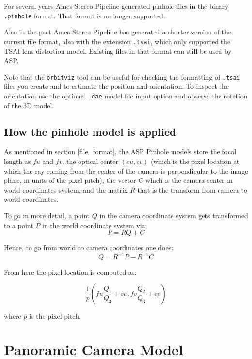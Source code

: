 For several years Ames Stereo Pipeline generated pinhole files in the binary \texttt{.pinhole} format.
That format is no longer supported.

Also in the past Ames Stereo Pipeline has generated a shorter version of the current file
format, also with the extension \texttt{.tsai}, which only supported the TSAI lens distortion model.
Existing files in that format can still be used by ASP.

Note that the \texttt{orbitviz} tool can be useful for checking the formatting of \texttt{.tsai}
files you create and to estimate the position and orientation. To inspect the orientation use 
the optional \texttt{.dae} model file input option and observe the rotation of the 3D model.

\subsection{How the pinhole model is applied}
\label{pinholemath}

As mentioned in section \ref{file_format}, the ASP Pinhole models store
the focal length as $fu$ and $fv$, the optical center $(cu, cv)$ (which
is the pixel location at which the ray coming from the center of the
camera is perpendicular to the image plane, in units of the pixel
pitch), the vector $C$ which is the camera center in world coordinates
system, and the matrix $R$ that is the transform from camera to world
coordinates.

To go in more detail, a point $Q$ in the camera coordinate system gets transformed
to a point $P$ in the world coordinate system via:
\begin{equation*}
 P = RQ + C
\end{equation*}

Hence, to go from world to camera coordinates one does:
\begin{equation*}
 Q = R^{-1}  P - R^{-1}  C
\end{equation*}

From here the pixel location is computed as:

\begin{equation*}
 \frac{1}{p} \left(fu \frac{Q_1}{Q_3} + cu, fv \frac{Q_2}{Q_3} + cv\right)
\end{equation*}

where $p$ is the pixel pitch.

\section{Panoramic Camera Model}
\label{panoramic}


